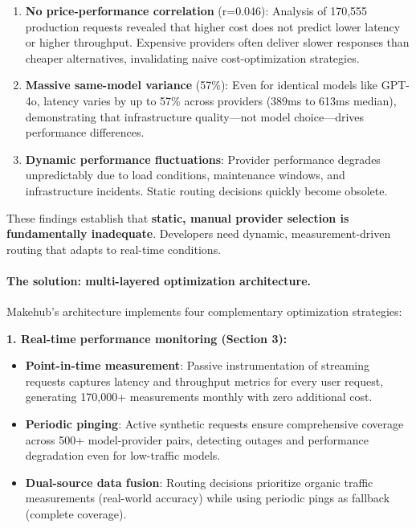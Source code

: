 \documentclass[english]{article}
\begin{document}
\begin{enumerate}
    \item \textbf{No price-performance correlation} (r=0.046): Analysis of 170,555 production requests revealed that higher cost does not predict lower latency or higher throughput. Expensive providers often deliver slower responses than cheaper alternatives, invalidating naive cost-optimization strategies.

    \item \textbf{Massive same-model variance} (57\%): Even for identical models like GPT-4o, latency varies by up to 57\% across providers (389ms to 613ms median), demonstrating that infrastructure quality—not model choice—drives performance differences.

    \item \textbf{Dynamic performance fluctuations}: Provider performance degrades unpredictably due to load conditions, maintenance windows, and infrastructure incidents. Static routing decisions quickly become obsolete.
\end{enumerate}

These findings establish that \textbf{static, manual provider selection is fundamentally inadequate}. Developers need dynamic, measurement-driven routing that adapts to real-time conditions.

\paragraph{The solution: multi-layered optimization architecture.}

Makehub's architecture implements four complementary optimization strategies:

\textbf{1. Real-time performance monitoring (Section 3):}
\begin{itemize}
    \item \textbf{Point-in-time measurement}: Passive instrumentation of streaming requests captures latency and throughput metrics for every user request, generating 170,000+ measurements monthly with zero additional cost.
    \item \textbf{Periodic pinging}: Active synthetic requests ensure comprehensive coverage across 500+ model-provider pairs, detecting outages and performance degradation even for low-traffic models.
    \item \textbf{Dual-source data fusion}: Routing decisions prioritize organic traffic measurements (real-world accuracy) while using periodic pings as fallback (complete coverage).
\end{itemize}
\end{document}
